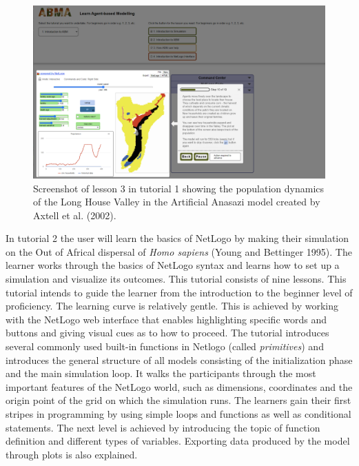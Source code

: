 \documentclass[
]{article}
\begin{document}
\begin{figure}
\includegraphics[width=1\linewidth]{paper_files/ScreenshotABMAtutorial1lesson3} \caption{Screenshot of lesson 3 in tutorial 1 showing the population dynamics of the Long House Valley in the Artificial Anasazi model created by Axtell et al. (2002).}\label{fig:screenshot-lesson-3}
\end{figure}

In tutorial 2 the user will learn the basics of NetLogo by making their simulation on the Out of Africal dispersal of \emph{Homo sapiens} (Young and Bettinger 1995). The learner works through the basics of NetLogo syntax and learns how to set up a simulation and visualize its outcomes. This tutorial consists of nine lessons. This tutorial intends to guide the learner from the introduction to the beginner level of proficiency. The learning curve is relatively gentle. This is achieved by working with the NetLogo web interface that enables highlighting specific words and buttons and giving visual cues as to how to proceed. The tutorial introduces several commonly used built-in functions in Netlogo (called \emph{primitives}) and introduces the general structure of all models consisting of the initialization phase and the main simulation loop. It walks the participants through the most important features of the NetLogo world, such as dimensions, coordinates and the origin point of the grid on which the simulation runs. The learners gain their first stripes in programming by using simple loops and functions as well as conditional statements. The next level is achieved by introducing the topic of function definition and different types of variables. Exporting data produced by the model through plots is also explained.
\end{document}
